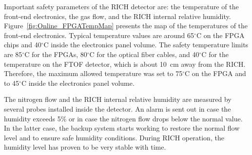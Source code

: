 \documentclass[5p,times,twocolumn]{elsarticle}
\begin{document}
Important safety parameters of the RICH detector are: the temperature of the front-end electronics, the gas  
flow, and the RICH internal relative humidity. Figure~\ref{fig:Online_FPGATempMap} presents the map of the
temperatures of the front-end electronics.
Typical temperature values are around 65$^\circ$C on the FPGA chips and 40$^\circ$C inside the electronics panel volume.
The safety temperature limits are 85$^\circ$C for the FPGAs, 80$^\circ$C for the optical fiber cables, and 40$^\circ$C
for the temperature on the FTOF detector, which is about 10~cm away from the RICH. Therefore, the maximum
allowed temperature was set to 75$^\circ$C on the FPGA and to 45$^\circ$C inside the electronics panel volume.


The nitrogen flow and the RICH internal relative humidity are measured by several probes installed inside the
detector.
An alarm is sent out in case the humidity exceeds 5\% or in case the nitrogen flow drops below the normal value. 
In the latter case, the backup system starts working to restore the normal flow level and to ensure safe humidity
conditions. During RICH operation, the humidity level has proven to be very stable with time.

\end{document}
